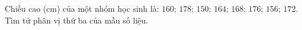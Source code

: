 \begin{ex}
Chiều cao (cm) của một nhóm học sinh là: $160$; $178$; $150$; $164$; $168$; $176$; $156$; $172$. Tìm tứ phân vị thứ ba của mẫu số liệu.
\end{ex}
